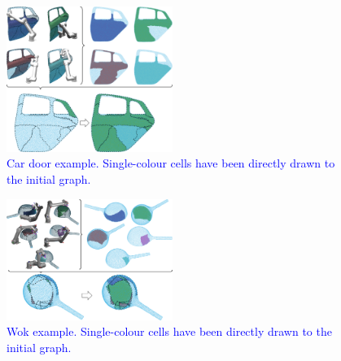 \documentclass[journal]{IEEEtran}
\begin{document}
\begin{figure}[t]
\centering
\includegraphics[width=0.48\textwidth]{figures/cardoor_exp/cardoor_comb}
\caption{\textcolor{blue}{Car door example. 
Single-colour cells have been directly drawn to
the initial graph. }}\label{fig:cardoor}
\end{figure}

\begin{figure}[t]
\centering
\includegraphics[width=0.48\textwidth]{figures/wok_exp/wok_comb}
\caption{\textcolor{blue}{Wok example. 
Single-colour cells have been directly drawn to
the initial graph. 
}}\label{fig:wok}
\end{figure}
\end{document}
